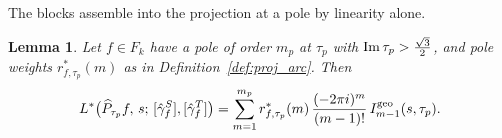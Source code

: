 \documentclass[11pt]{article}
\newtheorem{lemma}[theorem]{Lemma}
\begin{document}


The blocks assemble into the projection at a pole by linearity alone.

\begin{lemma}\label{lem:geowhole}
Let $f\in F_k$ have a pole of order $m_p$ at $\tau_p$ with ${\rm Im}\,\tau_p>\tfrac{\sqrt3}{2}$,
and pole weights $r^*_{f,\tau_p}(m)$ as in Definition~\ref{def:proj_arc}. Then
\begin{equation}\label{eq:geowhole}
L^*\big(\widehat P_{\tau_p}f,\,s;\,[\hat\gamma^S_f],[\hat\gamma^T_f]\big)
=\sum_{m=1}^{m_p}r^*_{f,\tau_p}(m)\,\frac{(-2\pi i)^{m}}{(m-1)!}\,I^{\rm geo}_{m-1}(s,\tau_p).
\end{equation}
\end{lemma}
\end{document}

